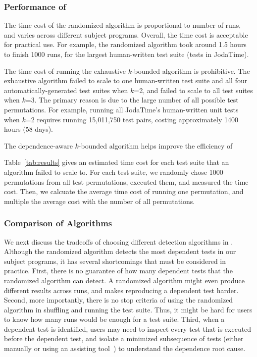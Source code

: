 \subsubsection{Performance of \ourtool}
\label{sec:performance}

The time cost of the randomized algorithm 
is proportional to number of runs, and
varies across different subject programs.
 Overall, the time cost is acceptable for practical use.
For example, the randomized algorithm took around 1.5 hours
to finish 1000 runs,  for the largest human-written test
suite (\jodatimetests tests in JodaTime).
 
The time cost of running the exhaustive $k$-bounded algorithm
is prohibitive. The exhaustive algorithm failed to
scale to one human-written test suite and all four automatically-generated
test suites when $k$=2, and failed to scale to all test suites
when $k$=3. The primary reason is due to the large
number of all possible test permutations. For example, running all
JodaTime's \jodatimetests human-written
unit tests when $k$=2 requires running 15,011,750 test pairs, costing
approximately 1400 hours (58 days). 

The dependence-aware $k$-bounded algorithm helps improve
the efficiency of 

Table~\ref{tab:results} gives an estimated time cost for each
test suite that an algorithm failed to scale to. For each test suite,
we randomly chose 1000 permutations from all
test permutations, executed them, and measured the time cost. Then,
we calcuate the average time cost of running one permutation, and multiple
the average cost with the number of all permutations.



\subsubsection{Comparison of Algorithms}
\label{sec:algcomparison}

We next discuss the tradeoffs of choosing different detection
algorithms in \ourtool. Although the randomized algorithm
detects the most dependent tests in our subject programs,
it has several shortcomings that must be considered
in practice. First, there is no guarantee of how many
dependent tests that the randomized algorithm can detect. A randomized
algorithm might even produce different results across runs,
and makes reproducing a dependent test harder.
Second, more importantly, there is no stop criteria
of using the randomized algorithm in shuffling and
running the test suite. Thus, it might be hard for users
to know how many runs would be enough for a test suite.
Third, when a dependent test is identified, users
may need to inspect every test that is executed
before the dependent test, and isolate  a minimized
subsequence of tests (either
manually or using an assisting tool~\cite{Zeller:2002}) to understand the dependence root cause.

